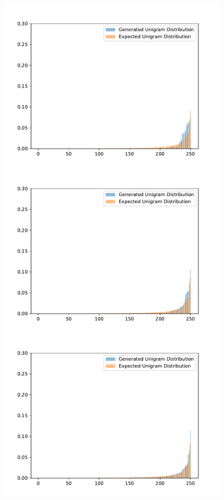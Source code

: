 \begin{figure}[H]
	\includegraphics[width=\linewidth]{img/plots/reddit/unigram_distribution_comparison_step_500000.pdf}
	\centering
	\small
	\endminipage\hfill
	\includegraphics[width=\linewidth]{img/plots/reddit/unigram_distribution_comparison_step_1000000.pdf}
	\centering
	\small
	\endminipage\hfill
	\includegraphics[width=\linewidth]{img/plots/reddit/unigram_distribution_comparison_step_1500000.pdf}

\end{figure}

